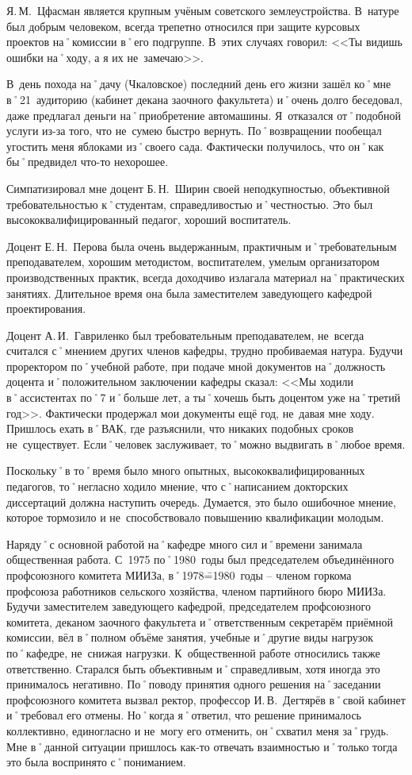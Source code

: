 Я.\,М.~Цфасман является крупным учёным советского землеустройства. В~натуре был добрым человеком, всегда трепетно относился при защите курсовых проектов на˚комиссии в˚его подгруппе. В~этих случаях говорил: <<Ты видишь ошибки на˚ходу, а я их не~замечаю>>.

В~день похода на˚дачу (Чкаловское) последний день его жизни зашёл ко˚мне в˚21~аудиторию (кабинет декана заочного факультета) и˚очень долго беседовал, даже предлагал деньги на˚приобретение автомашины. Я~отказался от˚подобной услуги из-за того, что не~сумею быстро вернуть. По˚возвращении пообещал угостить меня яблоками из˚своего сада. Фактически получилось, что он˚как бы˚предвидел что-то нехорошее.

Симпатизировал мне доцент Б.\,Н.~Ширин своей неподкупностью, объективной требовательностью к˚студентам, справедливостью и˚честностью. Это был высококвалифицированный педагог, хороший воспитатель.

Доцент Е.\,Н.~Перова была очень выдержанным, практичным и˚требовательным преподавателем, хорошим методистом, воспитателем, умелым организатором производственных практик, всегда доходчиво излагала материал на˚практических занятиях. Длительное время она была заместителем заведующего кафедрой проектирования.

Доцент А.\,И.~Гавриленко был требовательным преподавателем, не~всегда считался с˚мнением других членов кафедры, трудно пробиваемая натура. Будучи проректором по˚учебной работе, при подаче мной документов на˚должность доцента и˚положительном заключении кафедры сказал: <<Мы ходили в˚ассистентах по˚7 и˚больше лет, а ты˚хочешь быть доцентом уже на˚третий год>>. Фактически продержал мои документы ещё год, не~давая мне ходу. Пришлось ехать в˚ВАК, где разъяснили, что никаких подобных сроков не~существует. Если˚человек заслуживает, то˚можно выдвигать в˚любое время.

Поскольку˚в то˚время было много опытных, высококвалифицированных педагогов, то˚негласно ходило мнение, что с˚написанием докторских диссертаций должна наступить очередь. Думается, это было ошибочное мнение, которое тормозило и не~способствовало повышению квалификации молодым.

Наряду˚с основной работой на˚кафедре много сил и˚времени занимала общественная работа. С~1975 по˚1980~годы был председателем объединённого профсоюзного комитета МИИЗа, в˚1978\==1980~годы \--- членом горкома профсоюза работников сельского хозяйства, членом партийного бюро МИИЗа. Будучи заместителем заведующего кафедрой, председателем профсоюзного комитета, деканом заочного факультета и˚ответственным секретарём приёмной комиссии, вёл в˚полном объёме занятия, учебные и˚другие виды нагрузок по˚кафедре, не~снижая нагрузки. К~общественной работе относились также ответственно. Старался быть объективным и˚справедливым, хотя иногда это принималось негативно. По˚поводу принятия одного решения на˚заседании профсоюзного комитета вызвал ректор, профессор И.\,В.~Дегтярёв в˚свой кабинет и˚требовал его отмены. Но˚когда я˚ответил, что решение принималось коллективно, единогласно и не~могу его отменить, он˚схватил меня за˚грудь. Мне в˚данной ситуации пришлось как-то отвечать взаимностью и˚только тогда это была воспринято с˚пониманием.

